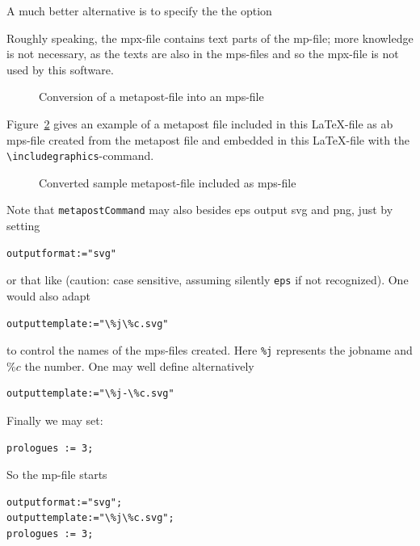 \documentclass[12pt]{book}
\newcommand{\gls}[1]{#1}
\begin{document}
A much better alternative is to specify the the option 


Roughly speaking, the mpx-file contains text parts of the mp-file; 
more knowledge is not necessary, as the texts are also in the mps-files 
and so the mpx-file is not used by this software. 

\begin{figure}[htb]
\begin{center}
\end{center}
\caption{\label{fig:mp2mps}Conversion of a metapost-file into an mps-file}
\end{figure}


Figure~\ref{fig:metapost} gives an example of a metapost file 
included in this \LaTeX-file as ab mps-file 
created from the metapost file 
and embedded in this \LaTeX-file 
with the {\tt\textbackslash includegraphics}-command. 

\begin{figure}[htb]
\begin{center}
\end{center}
\caption{\label{fig:metapost}
Converted sample metapost-file included as mps-file  }
\end{figure}

Note that \texttt{metapostCommand} may also besides \gls{eps} 
output \gls{svg} and \gls{png}, 
just by setting 
%
\begin{verbatim}
outputformat:="svg" 
\end{verbatim}
%
or that like 
(caution: case sensitive, assuming silently \texttt{eps} if not recognized). 
One would also adapt 
%
\begin{verbatim}
outputtemplate:="\%j\%c.svg"
\end{verbatim}
%
to control the names of the mps-files created. 
Here {\tt\%j} represents the jobname and $\%c$ the number. 
One may well define alternatively 
%
\begin{verbatim}
outputtemplate:="\%j-\%c.svg"
\end{verbatim}

Finally we may set: 
%
\begin{verbatim}
prologues := 3;
\end{verbatim}

So the mp-file starts 
%
\lstset{language=metapost, basicstyle=\normalsize}
\begin{lstlisting}
outputformat:="svg";
outputtemplate:="\%j\%c.svg";
prologues := 3;
\end{lstlisting}
\end{document}
